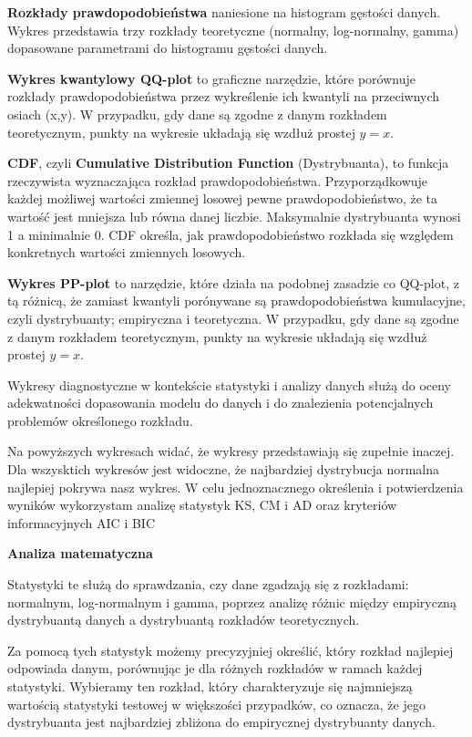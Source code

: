 \documentclass[a4paper,11pt]{article}
\begin{document}
\textbf{Rozkłady prawdopodobieństwa} naniesione na histogram gęstości danych. Wykres przedstawia trzy rozkłady teoretyczne (normalny, log-normalny, gamma) dopasowane parametrami do histogramu gęstości danych. 

\textbf{Wykres kwantylowy QQ-plot} to graficzne narzędzie, które porównuje rozkłady prawdopodobieństwa przez wykreślenie ich kwantyli na przeciwnych osiach (x,y). W przypadku, gdy dane są zgodne z danym rozkładem teoretycznym, punkty na wykresie układają się wzdłuż prostej \(y = x\).

\textbf{CDF}, czyli \textbf{Cumulative Distribution Function} (Dystrybuanta), to funkcja rzeczywista wyznaczająca rozkład prawdopodobieństwa. Przyporządkowuje każdej możliwej wartości zmiennej losowej pewne prawdopodobieństwo, że ta wartość jest mniejsza lub równa danej liczbie. Maksymalnie dystrybuanta wynosi 1 a minimalnie 0. CDF określa, jak prawdopodobieństwo rozkłada się względem konkretnych wartości zmiennych losowych.

\textbf{Wykres PP-plot} to narzędzie, które działa na podobnej zasadzie co QQ-plot, z tą różnicą, że zamiast kwantyli porónywane są prawdopodobieństwa kumulacyjne, czyli dystrybuanty; empiryczna i teoretyczna. W przypadku, gdy dane są zgodne z danym rozkładem teoretycznym, punkty na wykresie układają się wzdłuż prostej \(y = x\).

Wykresy diagnostyczne w kontekście statystyki i analizy danych służą do oceny adekwatności dopasowania modelu do danych i do znalezienia potencjalnych problemów określonego rozkładu.

Na powyższych wykresach widać, że wykresy przedstawiają się zupełnie inaczej. Dla wszysktich wykresów jest widoczne, że najbardziej dystrybucja normalna najlepiej pokrywa nasz wykres. W celu jednoznacznego określenia i potwierdzenia wyników wykorzystam analizę statystyk KS, CM i AD oraz kryteriów informacyjnych AIC i BIC

\vspace*{0.5cm}

\textbf{Analiza matematyczna}

Statystyki te służą do sprawdzania, czy dane zgadzają się z rozkładami: normalnym, log-normalnym i gamma, poprzez analizę różnic między empiryczną dystrybuantą danych a dystrybuantą rozkładów teoretycznych.

Za pomocą tych statystyk możemy precyzyjniej określić, który rozkład najlepiej odpowiada danym, porównując je dla różnych rozkładów w ramach każdej statystyki. Wybieramy ten rozkład, który charakteryzuje się najmniejszą wartością statystyki testowej w większości przypadków, co oznacza, że jego dystrybuanta jest najbardziej zbliżona do empirycznej dystrybuanty danych.
\end{document}
